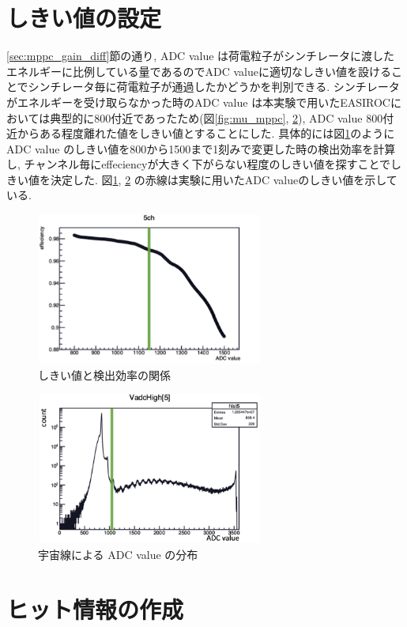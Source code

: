 \section{しきい値の設定}\label{sec:anal:threshold}
\ref{sec:mppc_gain_diff}節の通り, ADC value は荷電粒子がシンチレータに渡したエネルギーに比例している量であるのでADC valueに適切なしきい値を設けることでシンチレータ毎に荷電粒子が通過したかどうかを判別できる.
シンチレータがエネルギーを受け取らなかった時のADC value は本実験で用いたEASIROCにおいては典型的に800付近であったため(図\ref{fig:mu_mppc}, \ref{fig:threhist}), ADC value 800付近からある程度離れた値をしきい値とすることにした.
具体的には図\ref{fig:adc_eff}のようにADC value のしきい値を800から1500まで1刻みで変更した時の検出効率を計算し, チャンネル毎にeffeciencyが大きく下がらない程度のしきい値を探すことでしきい値を決定した.
図\ref{fig:adc_eff}, \ref{fig:threhist} の赤線は実験に用いたADC valueのしきい値を示している.
\begin{figure}[H]
    \centering
    \includegraphics[height=5.0cm]{img/adc_eff.png}
    \caption{しきい値と検出効率の関係}
    \label{fig:adc_eff}
\end{figure}
\begin{figure}[H]
    \centering
    \includegraphics[height=5.0cm]{img/pedestal.png}
    \caption{宇宙線による ADC value の分布}
    \label{fig:threhist}
\end{figure}

\section{ヒット情報の作成}
